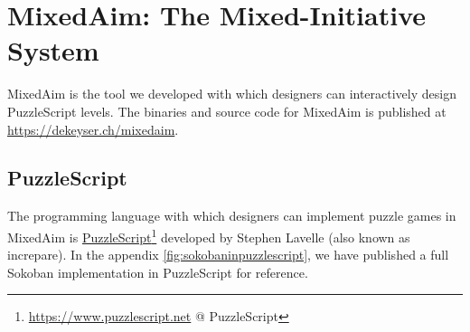 \chapter{MixedAim: The Mixed-Initiative System}

MixedAim is the tool we developed with which designers can interactively design PuzzleScript levels. The binaries and source code for MixedAim is published at \url{https://dekeyser.ch/mixedaim}.

\section{PuzzleScript}

The programming language with which designers can implement puzzle games in MixedAim is \href{https://www.puzzlescript.net}{PuzzleScript}\footnote{\url{https://www.puzzlescript.net} @ PuzzleScript} developed by Stephen Lavelle (also known as increpare).
In the appendix \autoref{fig:sokobaninpuzzlescript}, we have published a full Sokoban implementation in PuzzleScript for reference.

